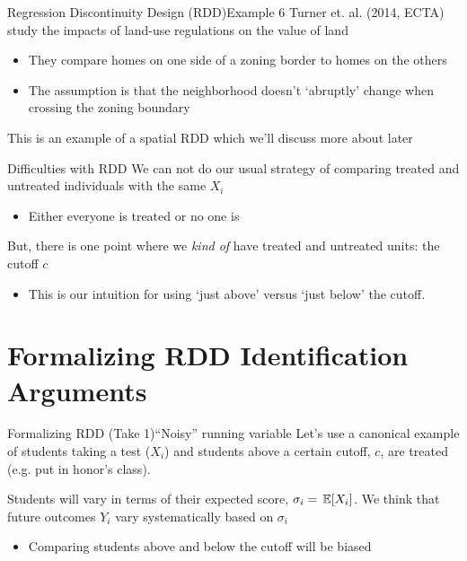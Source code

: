 \documentclass[aspectratio=169,t,11pt,table]{beamer}
\begin{document}
\begin{frame}{Regression Discontinuity Design (RDD)}{Example 6}
  Turner et. al. (2014, ECTA) study the impacts of land-use regulations on the value of land
  \begin{itemize}
    \item They compare homes on one side of a zoning border to homes on the others
    \item The assumption is that the neighborhood doesn't `abruptly' change when crossing the zoning boundary
  \end{itemize}

  \bigskip 
  This is an example of a spatial RDD which we'll discuss more about later
\end{frame}

\begin{frame}{Difficulties with RDD}
  We can not do our usual strategy of comparing treated and untreated individuals with the same $X_i$
  \begin{itemize}
    \item Either everyone is treated or no one is
  \end{itemize}

  \bigskip
  But, there is one point where we \emph{kind of} have treated and untreated units: the cutoff $c$
  \begin{itemize}
    \item This is our intuition for using `just above' versus `just below' the cutoff.
  \end{itemize}
\end{frame}

\section{Formalizing RDD Identification Arguments}

\begin{frame}{Formalizing RDD (Take 1)}{``Noisy'' running variable}
  Let's use a canonical example of students taking a test ($X_i$) and students above a certain cutoff, $c$, are treated (e.g. put in honor's class).

  \bigskip
  Students will vary in terms of their expected score, $\sigma_i = \expec{X_i}$. We think that future outcomes $Y_i$ vary systematically based on $\sigma_i$
  \begin{itemize}
    \item Comparing students above and below the cutoff will be biased  
  \end{itemize}
\end{frame}
\end{document}
